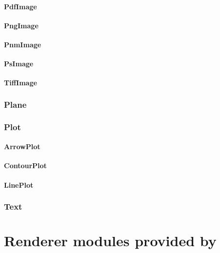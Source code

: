 \subsubsection{PdfImage}

\subsubsection{PngImage}

\subsubsection{PnmImage}

\subsubsection{PsImage}

\subsubsection{TiffImage}

\subsection{Plane}

\subsection{Plot}

\subsubsection{ArrowPlot}

\subsubsection{ContourPlot}

\subsubsection{LinePlot}

\subsection{Text}


\chapter{Renderer modules provided by \pyvisi}

